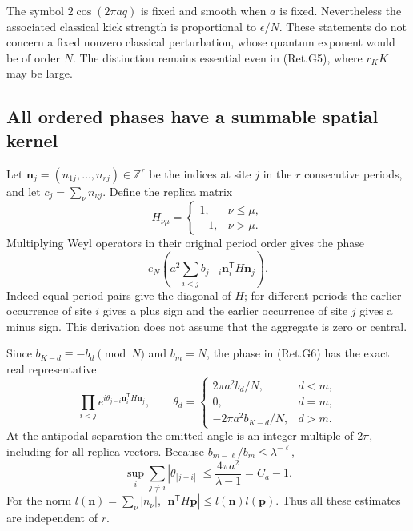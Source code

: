 The symbol \(2\cos(2\pi aq)\) is fixed and smooth when \(a\) is fixed.
Nevertheless the associated classical kick strength is proportional to
\(\epsilon/N\). These statements do not concern a fixed nonzero classical
perturbation, whose quantum exponent would be of order \(N\).
The distinction remains essential even in (Ret.G5), where \(r_KK\) may be large.

\hypertarget{all-ordered-phases-have-a-summable-spatial-kernel}{%
\subsection{All ordered phases have a summable spatial kernel}\label{all-ordered-phases-have-a-summable-spatial-kernel}}

Let \(\boldsymbol n_j=(n_{1j},\ldots,n_{rj})\in\mathbb Z^r\) be the
indices at site \(j\) in the \(r\) consecutive periods, and let
\(c_j=\sum_\nu n_{\nu j}\).
Define the replica matrix
\[
 H_{\nu\mu}=\begin{cases}1,&\nu\le\mu,\\-1,&\nu>\mu.\end{cases}
\]
Multiplying Weyl operators in their original period order gives the phase
\[
 e_N\left(a^2\sum_{i<j} b_{j-i}
                         \boldsymbol n_i^{\mathsf T}H\boldsymbol n_j\right).
                                                               \tag{Ret.G6}
\]
Indeed equal-period pairs give the diagonal of \(H\); for different periods
the earlier occurrence of site \(i\) gives a plus sign and the earlier
occurrence of site \(j\) gives a minus sign. This derivation does not assume
that the aggregate is zero or central.

Since \(b_{K-d}\equiv-b_d\pmod N\) and \(b_m=N\), the phase in (Ret.G6)
has the exact real representative
\[
 \prod_{i<j}
 e^{i\theta_{j-i}\boldsymbol n_i^{\mathsf T}H\boldsymbol n_j},
 \qquad
 \theta_d=\begin{cases}
 2\pi a^2 b_d/N,&d<m,\\
 0,&d=m,\\
 -2\pi a^2 b_{K-d}/N,&d>m.
 \end{cases}                                                \tag{Ret.G7}
\]
At the antipodal separation the omitted angle is an integer multiple of
\(2\pi\), including for all replica vectors. Because
\(b_{m-\ell}/b_m\le\lambda^{-\ell}\),
\[
 \sup_i\sum_{j\ne i}|\theta_{|j-i|}|
          \le\frac{4\pi a^2}{\lambda-1}=C_a-1.              \tag{Ret.G8}
\]
For the norm \(l(\boldsymbol n)=\sum_\nu|n_\nu|\),
\(|\boldsymbol n^{\mathsf T}H\boldsymbol p|\le l(\boldsymbol n)l(\boldsymbol p)\).
Thus all these estimates are independent of \(r\).


